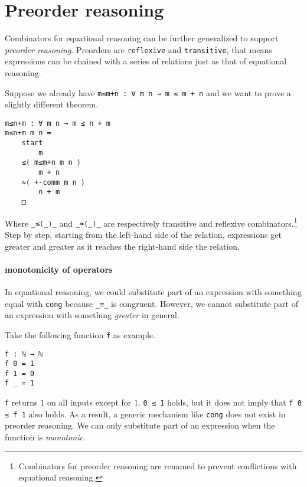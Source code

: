 \documentclass[../thesis.tex]{subfiles}
\begin{document}
\section{Preorder reasoning}

Combinators for equational reasoning can be further generalized to support \textit{preorder reasoning}.
Preorders are {\lstinline|reflexive|} and {\lstinline|transitive|}, that means
expressions can be chained with a series of relations just as that of equational
reasoning.

Suppose we already have {\lstinline|m≤m+n : ∀ m n → m ≤ m + n|} and we want to
prove a slightly different theorem.

\begin{lstlisting}
m≤n+m : ∀ m n → m ≤ n + m
m≤n+m m n =
    start
        m
    ≤⟨ m≤m+n m n ⟩
        m + n
    ≈⟨ +-comm m n ⟩
        n + m
    □
\end{lstlisting}

Where {\lstinline|_≤⟨_⟩_|} and {\lstinline|_≈⟨_⟩_|} are respectively transitive
and reflexive combinators.\footnote{Combinators for preorder reasoning are
renamed to prevent conflictions with equational reasoning.}
Step by step, starting from the left-hand side of the relation, expressions get
greater and greater as it reaches the right-hand side the relation.


\paragraph{monotonicity of operators}

In equational reasoning, we could substitute part of an expression with something
equal with {\lstinline|cong|} because {\lstinline|_≡_|} is congruent.
However, we cannot substitute part of an expression with something \textit{greater}
in general.

Take the following function {\lstinline|f|} as example.

\begin{lstlisting}
f : ℕ → ℕ
f 0 = 1
f 1 = 0
f _ = 1
\end{lstlisting}

{\lstinline|f|} returns $ 1 $ on all inputs except for $ 1 $.
{\lstinline|0 ≤ 1|} holds, but it does not imply that {\lstinline|f 0 ≤ f 1|} also holds.
As a result, a generic mechanism like {\lstinline|cong|} does not exist in preorder reasoning.
We can only substitute part of an expression when the function is \textit{monotonic}.
\end{document}
